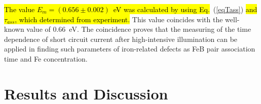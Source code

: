 \documentclass[sn-mathphys]{sn-jnl}%
\theoremstyle{thmstyleone}%
\theoremstyle{thmstyletwo}%
\theoremstyle{thmstylethree}%
\begin{document}
%
%

\hl{The value $E_m=(0.656\pm0.002)$~eV was calculated by using Eq.}~(\ref{eqTass})
\hl{and $\tau_{ass}$, which determined from experiment.}
This value coincides with the well-known \cite{FeBAssJAP2014,FeBkinAPL2008} value  of 0.66~eV.
The coincidence proves that the measuring of the time dependence of short circuit current
after high-intensive illumination can be applied in finding such
parameters of iron-related defects as FeB pair association time and Fe concentration.

\section{Results and Discussion}

\end{document}
